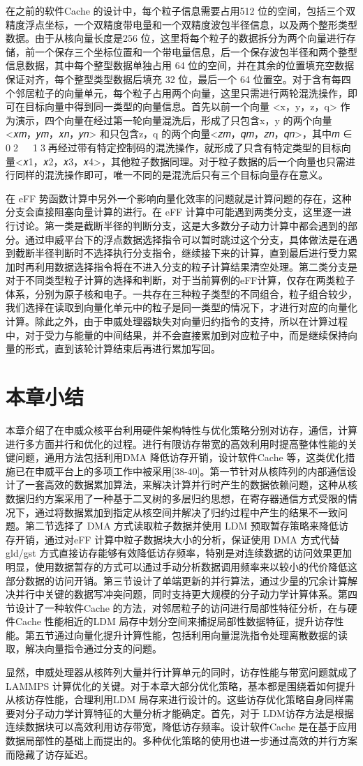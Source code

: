 在之前的软件Cache 的设计中，每个粒子信息需要占用512 位的空间，包括三个双精度浮点坐标，一个双精度带电量和一个双精度波包半径信息，以及两个整形类型数据。由于从核向量长度是256 位，这里将每个粒子的数据拆分为两个向量进行存储，前一个保存三个坐标位置和一个带电量信息，后一个保存波包半径和两个整型信息数据，其中每个整型数据单独占用 64 位的空间，并在其余的位置填充空数据保证对齐，每个整型类型数据后填充 32 位，最后一个 64 位置空。对于含有每四个邻居粒子的向量单元，每个粒子占用两个向量，这里只需进行两轮混洗操作，即可在目标向量中得到同一类型的向量信息。首先以前一个向量 <x，y，z，q> 作为演示，四个向量在经过第一轮向量混洗后，形成了只包含x，y 的两个向量<𝑥𝑚，𝑦𝑚，𝑥𝑛，𝑦𝑛> 和只包含z，q 的两个向量<𝑧𝑚，𝑞𝑚，𝑧𝑛，𝑞𝑛>，其中𝑚 ∈ 0􀀁2􀀁𝑛 ∈ 1􀀁3，再经过带有特定控制码的混洗操作，就形成了只含有特定类型的目标向量<𝑥1，𝑥2，𝑥3，𝑥4>，其他粒子数据同理。对于粒子数据的后一个向量也只需进行同样的混洗操作即可，唯一不同的是混洗后只有三个目标向量存在意义。

在 eFF 势函数计算中另外一个影响向量化效率的问题就是计算问题的存在，这种分支会直接阻塞向量计算的进行。在 eFF 计算中可能遇到两类分支，这里逐一进行讨论。第一类是截断半径的判断分支，这是大多数分子动力计算中都会遇到的部分。通过申威平台下的浮点数据选择指令可以暂时跳过这个分支，具体做法是在遇到截断半径判断时不选择执行分支指令，继续接下来的计算，直到最后进行受力累加时再利用数据选择指令将在不进入分支的粒子计算结果清空处理。第二类分支是对于不同类型粒子计算的选择和判断，对于当前算例的eFF计算，仅存在两类粒子体系，分别为原子核和电子。一共存在三种粒子类型的不同组合，粒子组合较少，我们选择在读取到向量化单元中的粒子是同一类型的情况下，才进行对应的向量化计算。除此之外，由于申威处理器缺失对向量归约指令的支持，所以在计算过程中，对于受力与能量的中间结果，并不会直接累加到对应粒子中，而是继续保持向量的形式，直到该轮计算结束后再进行累加写回。


\section{本章小结}
本章介绍了在申威众核平台利用硬件架构特性与优化策略分别对访存，通信，计算进行多方面并行和优化的过程。进行有限访存带宽的高效利用时提高整体性能的关键问题，通用方法包括利用DMA 降低访存开销，设计软件Cache 等，这类优化措施已在申威平台上的多项工作中被采用[38-40]。第一节针对从核阵列的内部通信设计了一套高效的数据累加算法，来解决计算并行时产生的数据依赖问题，这种从核数据归约方案采用了一种基于二叉树的多层归约思想，在寄存器通信方式受限的情况下，通过将数据累加到指定从核空间并解决了归约过程中产生的结果不一致问题。第二节选择了 DMA 方式读取粒子数据并使用 LDM 预取暂存策略来降低访存开销，通过对eFF 计算中粒子数据块大小的分析，保证使用 DMA 方式代替 gld/gst 方式直接访存能够有效降低访存频率，特别是对连续数据的访问效果更加明显，使用数据暂存的方式可以通过手动分析数据调用频率来以较小的代价降低这部分数据的访问开销。第三节设计了单端更新的并行算法，通过少量的冗余计算解决并行中关键的数据写冲突问题，同时支持更大规模的分子动力学计算体系。第四节设计了一种软件Cache 的方法，对邻居粒子的访问进行局部性特征分析，在与硬件Cache 性能相近的LDM 局存中划分空间来捕捉局部性数据特征，提升访存性能。第五节通过向量化提升计算性能，包括利用向量混洗指令处理离散数据的读取，解决向量指令通过分支的问题。

显然，申威处理器从核阵列大量并行计算单元的同时，访存性能与带宽问题就成了LAMMPS 计算优化的关键。对于本章大部分优化策略，基本都是围绕着如何提升从核访存性能，合理利用LDM 局存来进行设计的。这些访存优化策略自身同样需要对分子动力学计算特征的大量分析才能确定。首先，对于 LDM访存方法是根据连续数据块可以高效利用访存带宽，降低访存频率。设计软件Cache 是在基于应用数据局部性的基础上而提出的。多种优化策略的使用也进一步通过高效的并行方案而隐藏了访存延迟。

